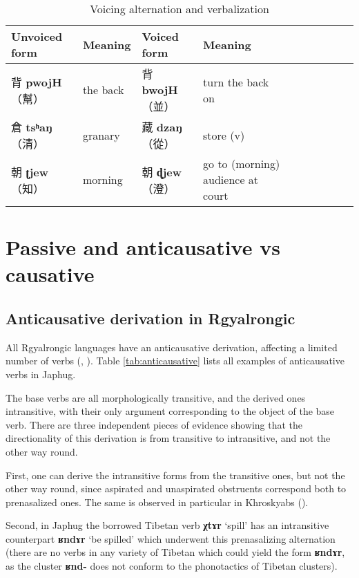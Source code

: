 \documentclass[oneside,a4paper,11pt]{article}
\newcommand{\ipa}[1]{\textbf{{\phon\mbox{#1}}}} %
\newcommand{\zh}[1]{{\cn #1}}
\newcommand{\zhc}[2]{\zh{#1} \ipa{#2}}
\newcommand{\mc}[1]{\zh{（#1）}}
\begin{document}
\begin{table}[H]
\caption{Voicing alternation and verbalization} \label{tab:denominal.oc}
\begin{tabular}{llllllllll}
\toprule
Unvoiced form &Meaning & Voiced form & Meaning\\
\midrule
\zhc{背}{pwojH} \mc{幫}	&the back& \zhc{背}{bwojH} \mc{並} & turn the back on \\
\zhc{倉}{tsʰaŋ} \mc{清}	&granary & \zhc{藏}{dzaŋ} \mc{從} & store (v) \\
\zhc{朝}{ʈjew} \mc{知}	&morning  & \zhc{朝}{ɖjew} \mc{澄} & go to (morning) audience at court \\
\bottomrule
\end{tabular}
\end{table}


\section{Passive and anticausative vs causative} \label{sec:anticausative.passive}

\subsection{Anticausative derivation in Rgyalrongic}
All Rgyalrongic languages have an anticausative derivation, affecting a limited number of verbs (\citealt{jacques15spontaneous}, \citealt[547]{lai17khroskyabs}). Table \ref{tab:anticausative} lists all examples of anticausative verbs in Japhug.

The base verbs are all morphologically transitive, and the derived ones intransitive, with their only argument corresponding to the object of the base verb. There are three independent pieces of evidence showing that the directionality of this derivation is from transitive to intransitive, and not the other way round. 

First, one can derive the intransitive forms from the transitive ones, but not the other way round, since aspirated and unaspirated obstruents correspond both to prenasalized ones. The same is observed in particular in Khroskyabs (\citealt[547-550]{lai17khroskyabs}).

Second, in Japhug the borrowed Tibetan verb \ipa{χtɤr} `spill' has an intransitive counterpart \ipa{ʁndɤr} `be spilled' which underwent this prenasalizing alternation (there are no verbs in any variety of Tibetan which could yield the form \ipa{ʁndɤr}, as the cluster \ipa{ʁnd-} does not conform to the phonotactics of Tibetan clusters). 
\end{document}
